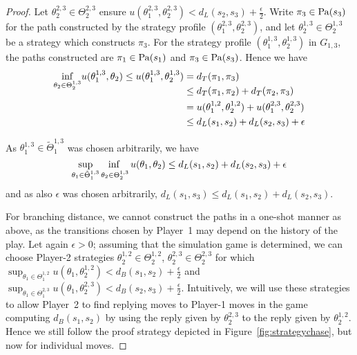 \documentclass[copyright,creativecommons,sharealike]{eptcs}
\theoremstyle{plain}
\newcommand*\Strat{\Theta}
\newcommand*\Stratblind{\tilde \Strat}
\begin{document}
\begin{proof}
  Let $\theta_2^{ 2, 3}\in \Strat_2^{ 2, 3}$ ensure $u(\theta_1^{ 2,
    3},\theta_2^{2, 3}) < d_L(s_2,s_3) + \frac{\epsilon}{2}$.  Write
  $\pi_3 \in \operatorname{Pa}(s_3)$ for the path constructed by the strategy
  profile $(\theta_1^{ 2, 3},\theta_2^{ 2, 3})$, and let $\theta_2^{
    1, 3}\in \Strat_2^{ 1, 3}$ be a strategy which constructs $\pi_3$.
  For the strategy profile $(\theta_1^{ 1, 3}, \theta_2^{ 1, 3})$ in
  $G_{ 1, 3}$, the paths constructed are $\pi_1\in \operatorname{Pa}( s_1)$ and
  $\pi_3\in \operatorname{Pa}( s_3)$.  Hence we have
  \begin{equation}
    \label{eq:triangle}
    \begin{split}
      \smash[b]{\inf_{\theta_2 \in \Strat_2^{ 1, 3}}} u(\theta_1^{ 1,
        3},\theta_2)\le
      u(\theta_1^{ 1, 3},\theta_2^{ 1, 3}) &= d_T(\pi_1,\pi_3) \\
      &\le d_T(\pi_1,\pi_2) + d_T(\pi_2,\pi_3) \\
      &= u(\theta_1^{ 1, 2}, \theta_2^{ 1, 2}) + u(\theta_1^{ 2,
        3},\theta_2^{ 2, 3}) \\ 
      &\le d_L(s_1,s_2) + d_L(s_2,s_3) + \epsilon \\
    \end{split}
  \end{equation}

  As $\theta_1^{ 1, 3}\in \Stratblind_1^{ 1, 3}$ was chosen arbitrarily,
  we have
  \begin{equation*}
    \adjustlimits \sup_{ \theta_1\in \Stratblind_1^{1, 3}} \inf_{
      \theta_2\in \Strat_2^{ 1, 3}} u( \theta_1, \theta_2)\le d_L(s_1,s_2) +
    d_L(s_2,s_3) + \epsilon
  \end{equation*}
  and as also $\epsilon$ was chosen arbitrarily, $d_L(s_1,s_3)\le
  d_L(s_1,s_2) + d_L(s_2,s_3)$.

  \smallskip For branching distance, we cannot construct the paths in a one-shot
  manner as above, as the transitions chosen by Player~1 may depend on
  the history of the play.  Let again $\epsilon> 0$; assuming that the
  simulation game is determined, we can choose Player-2 strategies
  $\theta_2^{ 1, 2}\in \Theta_2^{ 1, 2}$, $\theta_2^{ 2, 3}\in
  \Theta_2^{ 2, 3}$ for which $\sup_{ \theta_1\in \Theta_1^{ 1, 2}} u(
  \theta_1, \theta_2^{ 1, 2})< d_B( s_1, s_2)+ \frac\epsilon2$ and
  $\sup_{ \theta_1\in \Theta_1^{ 2, 3}} u( \theta_1, \theta_2^{ 2,
    3})< d_B( s_2, s_3)+ \frac\epsilon2$.  Intuitively, we will use
  these strategies to allow Player~2 to find replying moves to
  Player-1 moves in the game computing $d_B( s_1, s_2)$ by using the
  reply given by $\theta_2^{ 2, 3}$ to the reply given by $\theta_2^{
    1, 2}$.  Hence we still follow the proof strategy depicted in
  Figure~\ref{fig:strategychase}, but now for individual moves.


\end{proof}
\end{document}
